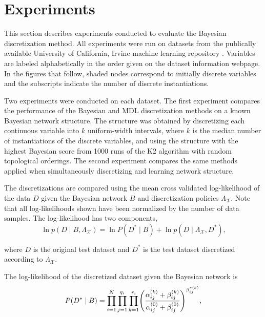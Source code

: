 \documentclass[twoside,11pt]{article}
\newcommand{\citep}[1]{\cite{#1}}
\newcommand{\paren}[1]{\mathopen{}\mathclose\bgroup\left(#1\aftergroup\egroup\right)}
\newcommand{\tim}[1]{\textit{\textcolor{blue}{#1}}}
\newcommand{\cX}{\mathcal{X}} %
\newcommand{\discset}{\Lambda_{\bm{\cX}}}
\begin{document}
\section{Experiments}
\label{sec:experiments}

This section describes experiments conducted to evaluate the Bayesian discretization method.
All experiments were run on datasets from the publically available University of California, Irvine machine learning repository \citep{Lichman_2013}.
Variables are labeled alphabetically in the order given on the dataset information webpage.
In the figures that follow, shaded nodes correspond to initially discrete variables and the subscripts indicate the number of discrete instantiations.

Two experiments were conducted on each dataset.
The first experiment compares the performance of the Bayesian and MDL discretization methods on a known Bayesian network structure.
The structure was obtained by discretizing each continuous variable into $k$ uniform-width intervals, where $k$ is the median number of instantiations of the discrete variables, and using the structure with the highest Bayesian score from \num{1000} runs of the K2 algorithm with random topological orderings.
The second experiment compares the same methods applied when simultaneously discretizing and learning network structure.

The discretizations are compared using the mean cross validated log-likelihood of the data $D$ given the Bayesian network $B$ and discretization policies $\discset$.
Note that all log-likelihoods shown have been normalized by the number of data samples.
The log-likelihood has two components,
\begin{equation}
\ln p(D\mid B, \discset) = \ln P(D^*\mid B) + \ln p(D\mid \discset, D^*)\text{,}
\end{equation}

\noindent
where $D$ is the original test dataset and $D^*$ is the test dataset discretized according to $\discset$.

The log-likelihood of the discretized dataset given the Bayesian network is
\begin{equation}
P(D^* \mid B) = \prod_{i=1}^N \prod_{j=1}^{q_i} \prod_{k=1}^{r_i}
\paren{
  \frac{
    \alpha_{ij}^{(k)} + \beta_{ij}^{(k)}
  }{
    \alpha_{ij}^{(0)} + \beta_{ij}^{(0)}
    }
}^{\beta_{ij}^{*(k)}}\text{,}
\end{equation}
\end{document}
